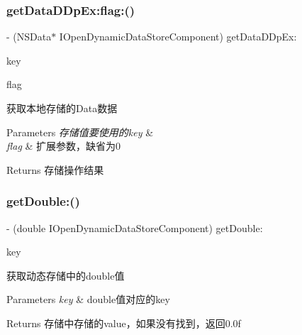 \subsubsection{\texorpdfstring{get\+Data\+D\+Dp\+Ex\+:flag\+:()}{getDataDDpEx:flag:()}}
{\footnotesize\ttfamily -\/ (N\+S\+Data$\ast$ I\+Open\+Dynamic\+Data\+Store\+Component) get\+Data\+D\+Dp\+Ex\+: \begin{DoxyParamCaption}\item[{(N\+S\+String $\ast$)}]{key }\item[{flag:(int)}]{flag }\end{DoxyParamCaption}}

获取本地存储的\+Data数据 
\begin{DoxyParams}{Parameters}
{\em 存储值要使用的key} & \\
\hline
{\em flag} & 扩展参数，缺省为0 \\
\hline
\end{DoxyParams}
\begin{DoxyReturn}{Returns}
存储操作结果 
\end{DoxyReturn}
\mbox{\label{protocol_i_open_dynamic_data_store_component_01-p_ad9d6da922e5c310416c7c31e6d8e9d9b}} 
\subsubsection{\texorpdfstring{get\+Double\+:()}{getDouble:()}}
{\footnotesize\ttfamily -\/ (double I\+Open\+Dynamic\+Data\+Store\+Component) get\+Double\+: \begin{DoxyParamCaption}\item[{(N\+S\+String $\ast$)}]{key }\end{DoxyParamCaption}}

获取动态存储中的double值 
\begin{DoxyParams}{Parameters}
{\em key} & double值对应的key \\
\hline
\end{DoxyParams}
\begin{DoxyReturn}{Returns}
存储中存储的value，如果没有找到，返回0.0f 
\end{DoxyReturn}
\mbox{\label{protocol_i_open_dynamic_data_store_component_01-p_abc03e2f993498fdca9c8b50d21a3ed25}} 
